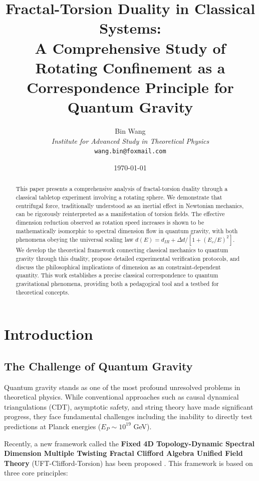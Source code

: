 \documentclass[UTF8]{ctex}\n\documentclass[12pt,a4paper]{article}
\title{\textbf{Fractal-Torsion Duality in Classical Systems:}\\
\textbf{A Comprehensive Study of Rotating Confinement as a Correspondence Principle for Quantum Gravity}}
\author{Bin Wang\\
\textit{Institute for Advanced Study in Theoretical Physics}\\
\texttt{wang.bin@foxmail.com}}
\date{\today}
\begin{document}
\maketitle

\begin{abstract}
This paper presents a comprehensive analysis of fractal-torsion duality through a classical tabletop experiment involving a rotating sphere. We demonstrate that centrifugal force, traditionally understood as an inertial effect in Newtonian mechanics, can be rigorously reinterpreted as a manifestation of torsion fields. The effective dimension reduction observed as rotation speed increases is shown to be mathematically isomorphic to spectral dimension flow in quantum gravity, with both phenomena obeying the universal scaling law $d(E) = d_{IR} + \Delta d/[1+(E_c/E)^2]$. We develop the theoretical framework connecting classical mechanics to quantum gravity through this duality, propose detailed experimental verification protocols, and discuss the philosophical implications of dimension as an constraint-dependent quantity. This work establishes a precise classical correspondence to quantum gravitational phenomena, providing both a pedagogical tool and a testbed for theoretical concepts.
\end{abstract}

\tableofcontents
\newpage

\section{Introduction}
\label{sec:intro}

\subsection{The Challenge of Quantum Gravity}

Quantum gravity stands as one of the most profound unresolved problems in theoretical physics. While conventional approaches such as causal dynamical triangulations (CDT), asymptotic safety, and string theory have made significant progress, they face fundamental challenges including the inability to directly test predictions at Planck energies ($E_P \sim 10^{19}$ GeV).

Recently, a new framework called the \textbf{Fixed 4D Topology-Dynamic Spectral Dimension Multiple Twisting Fractal Clifford Algebra Unified Field Theory} (UFT-Clifford-Torsion) has been proposed \cite{wang2026}. This framework is based on three core principles:
\end{document}
